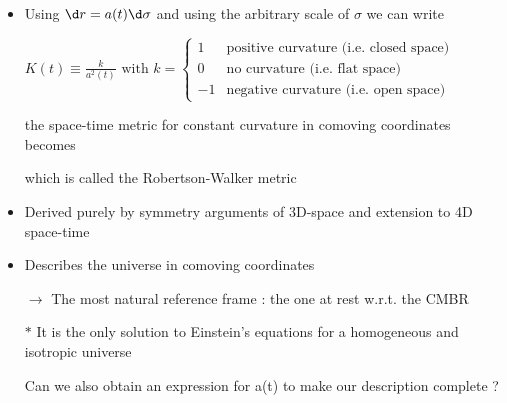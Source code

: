 \Tr
\begin{itemize}
\item Using {\blue $\d r=a(t)\d\sigma$} and using the arbitrary scale of $\sigma$ we can write
\item[] {\blue $\displaystyle K(t) \equiv \frac{k}{a^{2}(t)} \text{ with } k=
         \begin{cases}
         1 & \text{positive curvature (i.e. closed space)}\\
         0 & \text{no curvature (i.e. flat space)}\\
         -1 & \text{negative curvature (i.e. open space)}
         \end{cases}
        $}
\item[] the space-time metric for constant curvature in comoving coordinates becomes
\item[] \begin{center}
         {\red {}}
        \end{center}
\item[] which is called the {\blue Robertson-Walker metric}
\item Derived purely by symmetry arguments of 3D-space and extension to 4D space-time
\item Describes the universe in comoving coordinates
\item[] $\rightarrow$ The most natural reference frame : the one at rest w.r.t. the CMBR
\item[$\ast$] It is the only solution to Einstein's equations for a homogeneous and isotropic universe
\item[] {\blue Can we also obtain an expression for a(t) to make our description complete ?}
\end{itemize}

